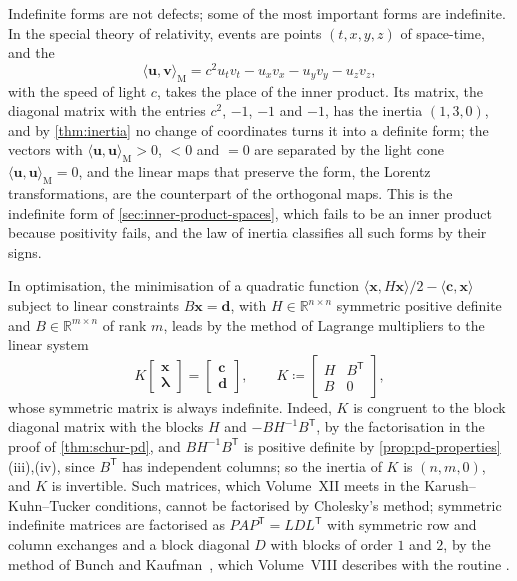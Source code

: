 Indefinite forms are not defects; some of the most important forms are indefinite. In the special theory of relativity, events are points $(t,x,y,z)$ of space-time, and the 
\[
\langle\mathbf u,\mathbf v\rangle_{\mathrm M}=c^2u_tv_t-u_xv_x-u_yv_y-u_zv_z ,
\]
with the speed of light $c$, takes the place of the inner product. Its matrix, the diagonal matrix with the entries $c^2$, $-1$, $-1$ and $-1$, has the inertia $(1,3,0)$, and by \cref{thm:inertia} no change of coordinates turns it into a definite form; the vectors with $\langle\mathbf u,\mathbf u\rangle_{\mathrm M}>0$, $<0$ and $=0$ are separated by the light cone $\langle\mathbf u,\mathbf u\rangle_{\mathrm M}=0$, and the linear maps that preserve the form, the Lorentz transformations, are the counterpart of the orthogonal maps. This is the indefinite form of \cref{sec:inner-product-spaces}, which fails to be an inner product because positivity fails, and the law of inertia classifies all such forms by their signs.

In optimisation, the minimisation of a quadratic function $\langle\mathbf x,H\mathbf x\rangle/2-\langle\mathbf c,\mathbf x\rangle$ subject to linear constraints $B\mathbf x=\mathbf d$, with $H\in\mathbb R^{n\times n}$ symmetric positive definite and $B\in\mathbb R^{m\times n}$ of rank $m$, leads by the method of Lagrange multipliers to the linear system
\[
K\begin{bmatrix}\mathbf x\\\boldsymbol\lambda\end{bmatrix}=\begin{bmatrix}\mathbf c\\\mathbf d\end{bmatrix},\qquad K\coloneqq\begin{bmatrix}H&B^{\mathsf T}\\B&0\end{bmatrix},
\]
whose symmetric matrix is always indefinite. Indeed, $K$ is congruent to the block diagonal matrix with the blocks $H$ and $-BH^{-1}B^{\mathsf T}$, by the factorisation in the proof of \cref{thm:schur-pd}, and $BH^{-1}B^{\mathsf T}$ is positive definite by \cref{prop:pd-properties}\,(iii),(iv), since $B^{\mathsf T}$ has independent columns; so the inertia of $K$ is $(n,m,0)$, and $K$ is invertible. Such matrices, which Volume~XII meets in the Karush--Kuhn--Tucker conditions, cannot be factorised by Cholesky's method; symmetric indefinite matrices are factorised as $PAP^{\mathsf T}=LDL^{\mathsf T}$ with symmetric row and column exchanges and a block diagonal $D$ with blocks of order $1$ and $2$, by the method of Bunch and Kaufman~\cite{bunchkaufman1977}, which Volume~VIII describes with the routine .

